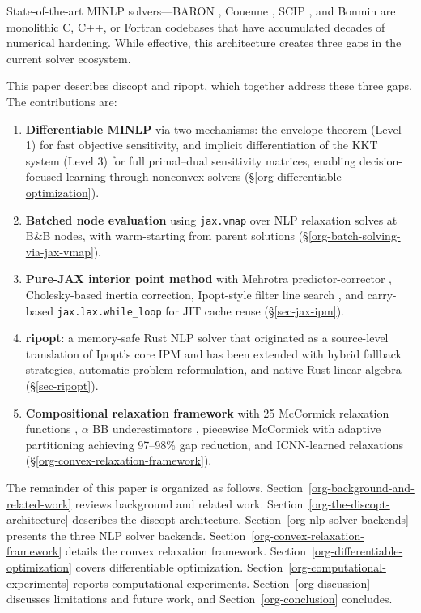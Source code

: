 \documentclass[12pt,preprint]{article}
\begin{document}
State-of-the-art MINLP solvers---BARON \cite{Tawarmalani2005}, Couenne \cite{Belotti2009couenne}, SCIP \cite{Bestuzheva2023}, and Bonmin \cite{Bonami2008} are monolithic C, C++, or Fortran codebases that have accumulated decades of numerical hardening. While effective, this architecture creates three gaps in the current solver ecosystem.


This paper describes discopt and ripopt, which together address these three gaps. The contributions are:


\begin{enumerate}
\item \textbf{Differentiable MINLP} via two mechanisms: the envelope theorem (Level 1) for fast objective sensitivity, and implicit differentiation of the KKT system (Level 3) for full primal--dual sensitivity matrices, enabling decision-focused learning through nonconvex solvers (\S\ref{org-differentiable-optimization}).

\item \textbf{Batched node evaluation} using \texttt{jax.vmap} over NLP relaxation solves at B\&B nodes, with warm-starting from parent solutions (\S\ref{org-batch-solving-via-jax-vmap}).

\item \textbf{Pure-JAX interior point method} with Mehrotra predictor-corrector \cite{Mehrotra1992}, Cholesky-based inertia correction, Ipopt-style filter line search \cite{Wachter2006}, and carry-based \texttt{jax.lax.while\_loop} for JIT cache reuse (\S\ref{sec-jax-ipm}).

\item \textbf{ripopt}: a memory-safe Rust NLP solver that originated as a source-level translation of Ipopt's core IPM and has been extended with hybrid fallback strategies, automatic problem reformulation, and native Rust linear algebra (\S\ref{sec-ripopt}).

\item \textbf{Compositional relaxation framework} with 25 McCormick relaxation functions \cite{McCormick1976,Tsoukalas2014}, $\alpha$ BB underestimators \cite{Androulakis1995,Adjiman1998}, piecewise McCormick with adaptive partitioning \cite{Castro2015} achieving 97--98\% gap reduction, and ICNN-learned relaxations \cite{Amos2017icnn} (\S\ref{org-convex-relaxation-framework}).

\end{enumerate}


The remainder of this paper is organized as follows. Section~\ref{org-background-and-related-work} reviews background and related work. Section~\ref{org-the-discopt-architecture} describes the discopt architecture. Section~\ref{org-nlp-solver-backends} presents the three NLP solver backends. Section~\ref{org-convex-relaxation-framework} details the convex relaxation framework. Section~\ref{org-differentiable-optimization} covers differentiable optimization. Section~\ref{org-computational-experiments} reports computational experiments. Section~\ref{org-discussion} discusses limitations and future work, and Section~\ref{org-conclusion} concludes.
\end{document}
